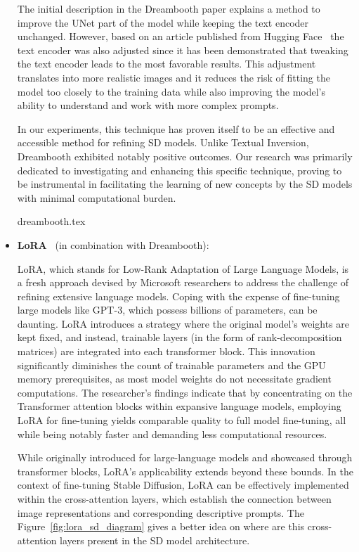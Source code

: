 \begin{itemize}
The initial description in the Dreambooth paper explains a method to improve the UNet part of the model while keeping the text encoder unchanged. However, based on an article published from Hugging Face~\cite{dreamboothGuideFinetuning} the text encoder was also adjusted since it has been demonstrated that tweaking the text encoder leads to the most favorable results. This adjustment translates into more realistic images and it reduces the risk of fitting the model too closely to the training data while also improving the model's ability to understand and work with more complex prompts.

In our experiments, this technique has proven itself to be an effective and accessible method for refining SD models. Unlike Textual Inversion, Dreambooth exhibited notably positive outcomes. Our research was primarily dedicated to investigating and enhancing this specific technique, proving to be instrumental in facilitating the learning of new concepts by the SD models with minimal computational burden.

{dreambooth.tex}

    \item \textbf{LoRA}~\cite{lora} (in combination with Dreambooth): 

LoRA, which stands for Low-Rank Adaptation of Large Language Models, is a fresh approach devised by Microsoft researchers to address the challenge of refining extensive language models. Coping with the expense of fine-tuning large models like GPT-3, which possess billions of parameters, can be daunting. LoRA introduces a strategy where the original model's weights are kept fixed, and instead, trainable layers (in the form of rank-decomposition matrices) are integrated into each transformer block. This innovation significantly diminishes the count of trainable parameters and the GPU memory prerequisites, as most model weights do not necessitate gradient computations. The researcher's findings indicate that by concentrating on the Transformer attention blocks within expansive language models, employing LoRA for fine-tuning yields comparable quality to full model fine-tuning, all while being notably faster and demanding less computational resources.

While originally introduced for large-language models and showcased through transformer blocks, LoRA's applicability extends beyond these bounds. In the context of fine-tuning Stable Diffusion, LoRA can be effectively implemented within the cross-attention layers, which establish the connection between image representations and corresponding descriptive prompts. The Figure~\ref{fig:lora_sd_diagram} gives a better idea on where are this cross-attention layers present in the SD model architecture. 


\end{itemize}
